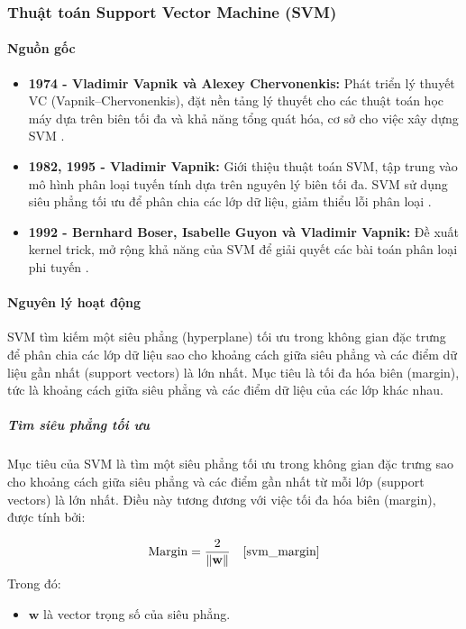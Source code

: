 \documentclass[a4paper,12pt]{article}
\begin{document}
\subsubsection{Thuật toán Support Vector Machine (SVM)}

\paragraph{Nguồn gốc}
\begin{itemize}
    \item \textbf{1974 - Vladimir Vapnik và Alexey Chervonenkis:} Phát triển lý thuyết VC (Vapnik–Chervonenkis), đặt nền tảng lý thuyết cho các thuật toán học máy dựa trên biên tối đa và khả năng tổng quát hóa, cơ sở cho việc xây dựng SVM \cite{vapnik1974}.
    \item \textbf{1982, 1995 - Vladimir Vapnik:} Giới thiệu thuật toán SVM, tập trung vào mô hình phân loại tuyến tính dựa trên nguyên lý biên tối đa. SVM sử dụng siêu phẳng tối ưu để phân chia các lớp dữ liệu, giảm thiểu lỗi phân loại \cite{vapnik1995}.
    \item \textbf{1992 - Bernhard Boser, Isabelle Guyon và Vladimir Vapnik:} Đề xuất kernel trick, mở rộng khả năng của SVM để giải quyết các bài toán phân loại phi tuyến \cite{boser1992}.
\end{itemize}

\paragraph{Nguyên lý hoạt động}
\hspace{5mm}SVM tìm kiếm một siêu phẳng (hyperplane) tối ưu trong không gian đặc trưng để phân chia các lớp dữ liệu sao cho khoảng cách giữa siêu phẳng và các điểm dữ liệu gần nhất (support vectors) là lớn nhất. Mục tiêu là tối đa hóa biên (margin), tức là khoảng cách giữa siêu phẳng và các điểm dữ liệu của các lớp khác nhau.

\subparagraph{Tìm siêu phẳng tối ưu}  
\hspace{5mm}Mục tiêu của SVM là tìm một siêu phẳng tối ưu trong không gian đặc trưng sao cho khoảng cách giữa siêu phẳng và các điểm gần nhất từ mỗi lớp (support vectors) là lớn nhất. Điều này tương đương với việc tối đa hóa biên (margin), được tính bởi:

\[
\text{Margin} = \frac{2}{\|\mathbf{w}\|} \quad \text{\cite{svm_margin}}
\]
Trong đó:
\begin{itemize}
    \item \(\mathbf{w}\) là vector trọng số của siêu phẳng.
\end{itemize}
\end{document}
